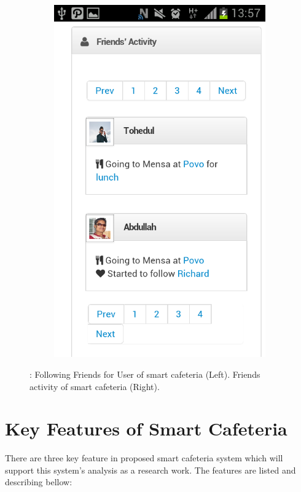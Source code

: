 \begin{figure}[h]
{\begin{subfigure}[b]{.5\textwidth}
{  \includegraphics[width=0.9\linewidth]{ch4/Prototype/Mobile/friendsactivity}
  }
\end{subfigure}
}
\caption{: Following Friends for User of smart cafeteria (Left). Friends activity of smart cafeteria (Right).}
\label{fig:PMUserFollow}
\end{figure}
\newpage

\section{Key Features of Smart Cafeteria}
\label{sec:keyFeaturesSC}
There are three key feature in proposed smart cafeteria system which will
support this system's analysis as a research work. The features are listed and
describing bellow:

